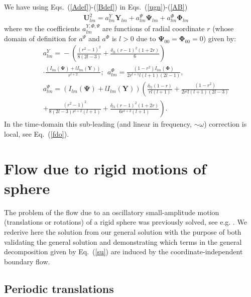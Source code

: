 \documentclass[aps,prx,twocolumn,amsmath,amssymb,amsfonts]{revtex4-2}
\begin{document}
{We have using Eqs.~(\ref{Adef})-(\ref{Bdef}) in Eqs.~(\ref{ugn})-(\ref{AB})
\begin{eqnarray}&&
\bm U^2_{lm}=a_{lm}^{Y}\bm Y_{lm}\!+\! a_{lm}^{\Psi}\bm \Psi_{lm} \!+  \!a_{lm}^{\Phi}\bm \Phi_{lm}
\end{eqnarray}
where we the coefficients $a_{lm}^{Y,\Phi,\Psi}$ are functions of radial coordinate $r$ (whose domain of definition for $a^{\Psi}$ and $a^{\Phi}$ is $l>0$ due to $\bm \Psi_{00}=\bm \Phi_{00}=0$) given by:
\begin{eqnarray}&&
a_{lm}^{Y}\! = \!-\left(\frac{(r^2-1)^2}{8(2l-3)}+\frac{\delta_{l1}(r-1)^2(1+2r)}{6}\right)
\\&&
\cdot \frac{( I_{lm}(\bm \Psi) \!+\! l I_{lm}(\bm Y))}{r^{l+2}};\ \ a_{lm}^{\Phi} = \frac{(1-r^2) I_{lm}(\bm \Phi)}{2r^{l+1}l(l+1)(2l-1)},
\nonumber\\&&
a_{lm}^{\Psi} \!=\!  ( I_{lm}(\bm \Psi)\! +\! l I_{lm}(\bm Y))
\left(\frac{\delta_{l1}(1\!-\!r)}{rl(l\!+\!1)} \!+\!\frac{(1\!-\!r^2)}{2r^{l}l(l\!+\!1)(2l\!-\!3)}
\right.\nonumber\\&&\left.
+\frac{(r^2-1)^2}{8(2l-3)r^{l+2}(l+1)}+\frac{\delta_{l1}(r-1)^2(1+2r)}{6r^{l+2}(l+1)}
\right).\nonumber
\end{eqnarray}
In the time-domain this sub-leading (and linear in frequency, $\sim \omega$) correction is local, see Eq.~(\ref{fdo}).







\section{Flow due to rigid motions of sphere} \label{oscillating}

The problem of the flow due to an oscillatory small-amplitude motion (translations or rotations) of a rigid sphere was previously solved, see e.g. \cite{kim}. We rederive here the solution from our general solution with the purpose of both validating the general solution and demonstrating which terms in the general decomposition given by Eq.~(\ref{su}) are induced by the coordinate-independent boundary flow.

\subsection{Periodic translations}

}
\end{document}
